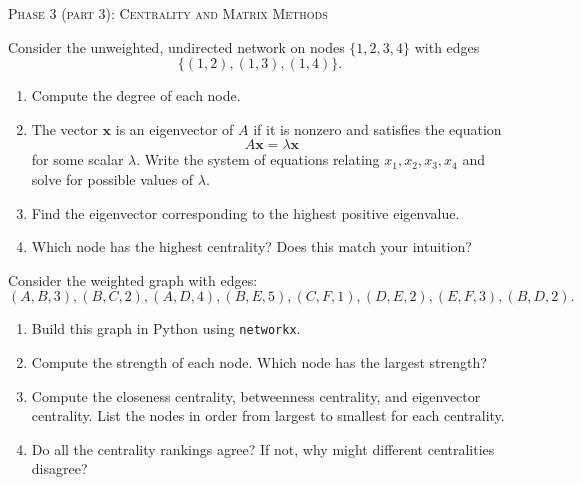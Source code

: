 \documentclass[10pt]{article}
\begin{document}
\begin{center}
\Large{\textsc{Phase 3 (part 3): Centrality and Matrix Methods}}\\
\end{center}

\begin{enumerate}[{$1.]$}]

\item Consider the unweighted, undirected network on nodes $\{1,2,3,4\}$ with edges
\[
\{(1,2),(1,3),(1,4)\}.
\]

\begin{enumerate}[{$a.)$}]
\item Compute the degree of each node.
\vfill

\item The vector $\boldsymbol{x}$ is an eigenvector of $A$ if it is nonzero and satisfies the equation
\[ A\boldsymbol{x} = \lambda \boldsymbol{x}\]
for some scalar $\lambda$.  Write the system of equations relating $x_1,x_2,x_3,x_4$ and solve for possible values of $\lambda$. 
\vfill\vfill

\item Find the eigenvector corresponding to the highest positive eigenvalue. 
\vfill

\item Which node has the highest centrality? Does this match your intuition?
\vfill
\end{enumerate}

\pagebreak

\item Consider the weighted graph with edges:
\[
(A,B,3), (B,C,2), (A,D,4), (B,E,5), (C,F,1), (D,E,2), (E,F,3), (B,D,2).
\]

\begin{enumerate}[{$a.)$}]
\item Build this graph in Python using \texttt{networkx}. 

\item Compute the strength of each node. Which node has the largest strength?
\vfill

\item Compute the closeness centrality, betweenness centrality, and eigenvector centrality.
List the nodes in order from largest to smallest for each centrality.
\vfill\vfill

\item Do all the centrality rankings agree? If not, why might different centralities disagree?
\vfill
\end{enumerate}

\end{enumerate}
\end{document}
